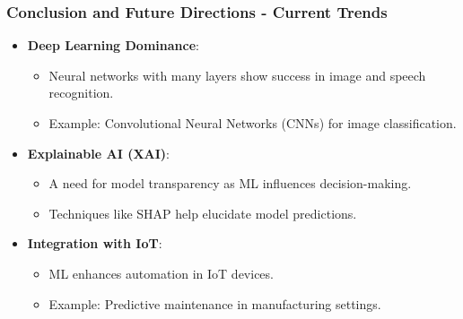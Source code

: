 \documentclass[aspectratio=169]{beamer}
\begin{document}
\begin{frame}[fragile]
    \frametitle{Conclusion and Future Directions - Current Trends}
    \begin{itemize}
        \item \textbf{Deep Learning Dominance}:
            \begin{itemize}
                \item Neural networks with many layers show success in image and speech recognition.
                \item Example: Convolutional Neural Networks (CNNs) for image classification.
            \end{itemize}
        \item \textbf{Explainable AI (XAI)}:
            \begin{itemize}
                \item A need for model transparency as ML influences decision-making.
                \item Techniques like SHAP help elucidate model predictions.
            \end{itemize}
        \item \textbf{Integration with IoT}:
            \begin{itemize}
                \item ML enhances automation in IoT devices.
                \item Example: Predictive maintenance in manufacturing settings.
            \end{itemize}
    \end{itemize}
\end{frame}
\end{document}

